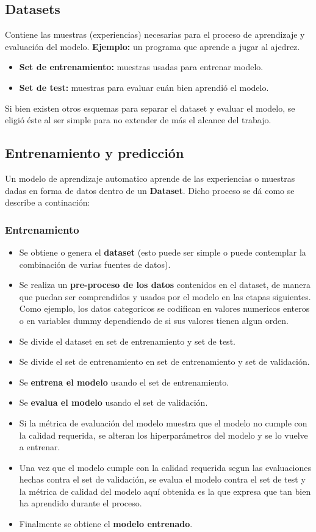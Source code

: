 \documentclass[
11pt, %
oneside, %
spanish, %
singlespacing, %
parskip, %
headsepline, %
chapterinoneline, %
]{MastersDoctoralThesis} %
\begin{document}
\subsection{Datasets}
Contiene las muestras (experiencias) necesarias para el proceso de aprendizaje y evaluación del modelo.
\textbf{Ejemplo:} un programa que aprende a jugar al ajedrez.
\begin{itemize}
\item \textbf{Set de entrenamiento:} muestras usadas para entrenar modelo.
\item \textbf{Set de test:} muestras para evaluar cuán bien aprendió el modelo.
\end{itemize}

Si bien existen otros esquemas para separar el dataset y evaluar el modelo, se eligió éste al ser simple para no extender de más el alcance del trabajo.

\subsection{Entrenamiento y predicción}

Un modelo de aprendizaje automatico aprende de las experiencias o muestras dadas en forma de datos dentro de un \textbf{Dataset}. Dicho proceso se dá como se describe a continación:

\subsubsection*{Entrenamiento}
\begin{itemize}
\item Se obtiene o genera el \textbf{dataset} (esto puede ser simple o puede contemplar la combinación de varias fuentes de datos).
\item Se realiza un \textbf{pre-proceso de los datos} contenidos en el dataset, de manera que puedan ser comprendidos y usados por el modelo en las etapas siguientes. Como ejemplo, los datos categoricos se codifican en valores numericos enteros o en variables dummy dependiendo de si sus valores tienen algun orden. 
\item Se divide el dataset en set de entrenamiento y set de test.
\item Se divide el set de entrenamiento en set de entrenamiento y set de validación.
\item Se \textbf{entrena el modelo} usando el set de entrenamiento.
\item Se \textbf{evalua el modelo} usando el set de validación.
\item Si la métrica de evaluación del modelo muestra que el modelo no cumple con la calidad requerida, se alteran los hiperparámetros del modelo y se lo vuelve a entrenar. 
\item Una vez que el modelo cumple con la calidad requerida segun las evaluaciones hechas contra el set de validación, se evalua el modelo contra el set de test y la métrica de calidad del modelo aquí obtenida es la que expresa que tan bien ha aprendido durante el proceso.
\item  Finalmente se obtiene el \textbf{modelo entrenado}.
\end{itemize}
\end{document}
